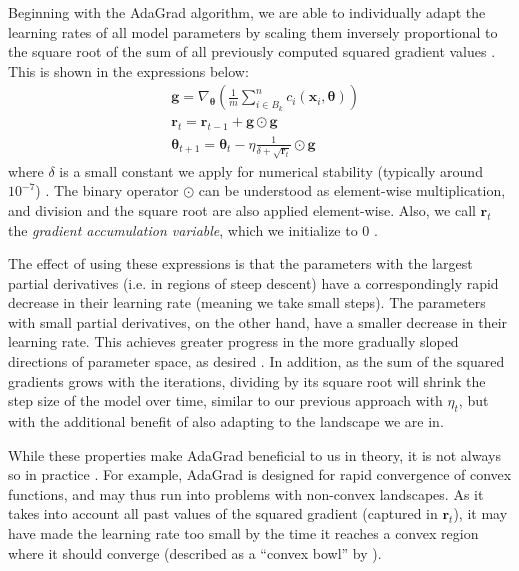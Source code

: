 Beginning with the AdaGrad algorithm, we are able to individually adapt the learning rates of all model parameters by scaling them inversely proportional to the square root of the sum of all previously computed squared gradient values \cite{deeplearningbookChapter8}. This is shown in the expressions below:
\begin{align*}
    &\boldsymbol{g} = \nabla_{\boldsymbol{\theta}} \left ( \frac{1}{m} \sum_{i\in B_k}^n c_i (\boldsymbol{x}_i, \boldsymbol{\theta} ) \right )
    \\
    &\boldsymbol r_t = \boldsymbol r_{t-1} + \boldsymbol{g} \odot \boldsymbol{g}
    \\
    &\boldsymbol{\theta}_{t+1} = \boldsymbol{\theta}_t - \eta \frac{1}{\delta + \sqrt{\boldsymbol r_t}} \odot \boldsymbol{g}
\end{align*}
where $\delta$ is a small constant we apply for numerical stability (typically around $10^{-7}$) \cite{deeplearningbookChapter8}. The binary operator $\odot$ can be understood as element-wise multiplication, and division and the square root are also applied element-wise. Also, we call $\boldsymbol r_t$ the \emph{gradient accumulation variable}, which we initialize to 0 \cite{deeplearningbookChapter8}.

The effect of using these expressions is that the parameters with the largest partial derivatives (i.e. in regions of steep descent) have a correspondingly rapid decrease in their learning rate (meaning we take small steps).  The parameters with small partial derivatives, on the other hand, have a smaller decrease in their learning rate. This achieves greater progress in the more gradually sloped directions of parameter space, as desired \cite{deeplearningbookChapter8}. In addition, as the sum of the squared gradients grows with the iterations, dividing by its square root will shrink the step size of the model over time, similar to our previous approach with $\eta_t$, but with the additional benefit of also adapting to the landscape we are in.

While these properties make AdaGrad beneficial to us in theory, it is not always so in practice \cite{deeplearningbookChapter8}. For example, AdaGrad is designed for rapid convergence of convex functions, and may thus run into problems with non-convex landscapes. As it takes into account all past values of the squared gradient (captured in $\boldsymbol r_t$), it may have made the learning rate too small by the time it reaches a convex region where it should converge (described as a ``convex bowl'' by \textcite{deeplearningbookChapter8}). 

